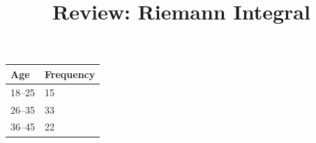 \documentclass[
  twocolumn,
  landscape]{report}
\title{Review: Riemann Integral}
\author{}
\date{}
\begin{document}
\maketitle

\listoffigures
\listoftables

\begin{tabular}{|l|l|}\hline
Age & Frequency \\ \hline
18--25  & 15 \\
26--35  & 33 \\
36--45  & 22 \\ \hline
\end{tabular}
\end{document}
